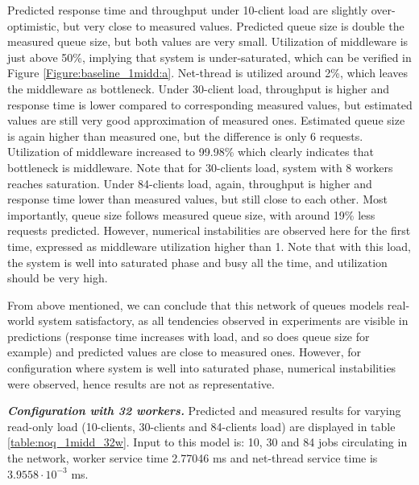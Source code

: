 \documentclass[11pt,a4paper]{article}
\begin{document}
Predicted response time and throughput under 10-client load are slightly over-optimistic, but very close to measured values. Predicted queue size is double the measured queue size, but both values are very small. Utilization of middleware is just above 50\%, implying that system is under-saturated, which can be verified in Figure \ref{Figure:baseline_1midd:a}. Net-thread is utilized around 2\%, which leaves the middleware as bottleneck. Under 30-client load, throughput is higher and response time is lower compared to corresponding measured values, but estimated values are still very good approximation of measured ones. Estimated queue size is again higher than measured one, but the difference is only 6 requests. Utilization of middleware increased to 99.98\% which clearly indicates that bottleneck is middleware. Note that for 30-clients load, system with 8 workers reaches saturation. Under 84-clients load, again, throughput is higher and response time lower than measured values, but still close to each other. Most importantly, queue size follows measured queue size, with around 19\% less requests predicted. However, numerical instabilities are observed here for the first time, expressed as middleware utilization higher than 1. Note that with this load, the system is well into saturated phase and busy all the time, and utilization should be very high.

From above mentioned, we can conclude that this network of queues models real-world system satisfactory, as all tendencies observed in experiments are visible in predictions (response time increases with load, and so does queue size for example) and predicted values are close to measured ones. However, for configuration where system is well into saturated phase, numerical instabilities were observed, hence results are not as representative.


\textbf{\textit{Configuration with 32 workers.}} Predicted and measured results for varying read-only load (10-clients, 30-clients and 84-clients load) are displayed in table \ref{table:noq_1midd_32w}. Input to this model is: 10, 30 and 84 jobs circulating in the network, worker service time 2.77046 ms and net-thread service time is $3.9558 \cdot 10^{-3}$ ms.
\end{document}
